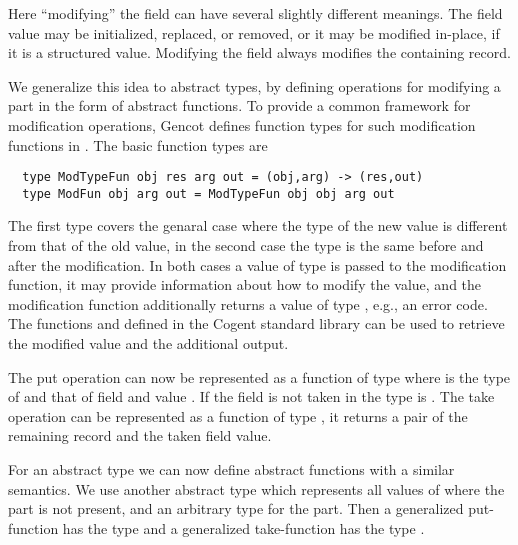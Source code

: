 Here ``modifying'' the field can have several slightly different meanings. The field value may be initialized, replaced,
or removed, or it may be modified in-place, if it is a structured value. Modifying the field always modifies the 
containing record.

We generalize this idea to abstract types, by defining operations for modifying a part in the form of abstract functions.
To provide a common framework for modification operations, Gencot defines function types for such modification functions 
in . The basic function types are
\begin{verbatim}
  type ModTypeFun obj res arg out = (obj,arg) -> (res,out)
  type ModFun obj arg out = ModTypeFun obj obj arg out
\end{verbatim}
The first type covers the genaral case where the type of the new value is different from that of the old value, in the second
case the type is the same before and after the modification. In both cases a value of type  is passed to the modification
function, it may provide information about how to modify the value, and the modification function additionally returns a value of
type , e.g., an error code. The functions  and  defined in the Cogent standard library can be used
to retrieve the modified value and the additional output.

The put operation can now be represented as a function of type  where  is the type of
 and  that of field  and value . If the field is not taken in  the type is .
The take operation can be represented as a function of type , it returns 
a pair of the remaining record and the taken field value.

For an abstract type  we can now define abstract functions with a similar semantics. We use another abstract type 
which represents all values of  where the part is not present, and an arbitrary type  for the part. Then
a generalized put-function has the type  and a generalized take-function has the type
.

